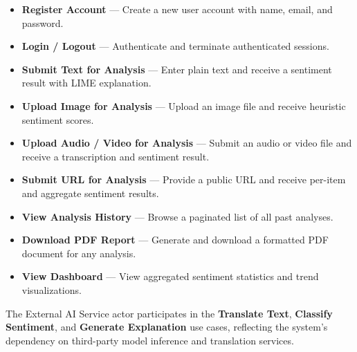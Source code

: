 \documentclass[12pt, a4paper]{report}
\begin{document}
\begin{itemize}[noitemsep, leftmargin=2em]
    \item \textbf{Register Account} --- Create a new user account with name, email, and password.
    \item \textbf{Login / Logout} --- Authenticate and terminate authenticated sessions.
    \item \textbf{Submit Text for Analysis} --- Enter plain text and receive a sentiment result with LIME explanation.
    \item \textbf{Upload Image for Analysis} --- Upload an image file and receive heuristic sentiment scores.
    \item \textbf{Upload Audio / Video for Analysis} --- Submit an audio or video file and receive a transcription and sentiment result.
    \item \textbf{Submit URL for Analysis} --- Provide a public URL and receive per-item and aggregate sentiment results.
    \item \textbf{View Analysis History} --- Browse a paginated list of all past analyses.
    \item \textbf{Download PDF Report} --- Generate and download a formatted PDF document for any analysis.
    \item \textbf{View Dashboard} --- View aggregated sentiment statistics and trend visualizations.
\end{itemize}

The External AI Service actor participates in the \textbf{Translate Text}, \textbf{Classify Sentiment}, and \textbf{Generate Explanation} use cases, reflecting the system's dependency on third-party model inference and translation services.
\end{document}
